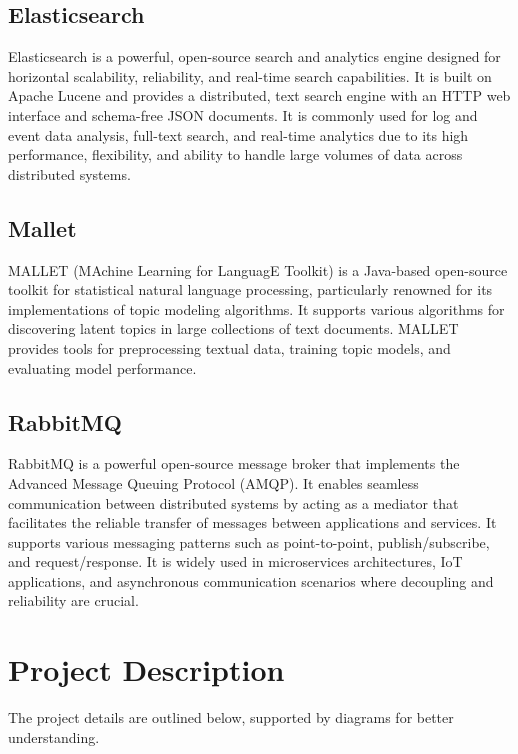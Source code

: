 \subsection{Elasticsearch}
Elasticsearch is a powerful, open-source search and analytics engine designed for horizontal scalability,
reliability, and real-time search capabilities. It is built on Apache Lucene and provides a distributed, text
search engine with an HTTP web interface and schema-free JSON documents. It is commonly used for log and event
data analysis, full-text search, and real-time analytics due to its high performance, flexibility, and ability
to handle large volumes of data across distributed systems. \cite{elastic}

\subsection{Mallet}
MALLET (MAchine Learning for LanguagE Toolkit) is a Java-based open-source toolkit for statistical natural
language processing, particularly renowned for its implementations of topic modeling algorithms. It supports
various algorithms for discovering latent topics in large collections of text documents. MALLET provides tools
for preprocessing textual data, training topic models, and evaluating model performance. \cite{mallet}

\subsection{RabbitMQ}
RabbitMQ is a powerful open-source message broker that implements the Advanced Message Queuing Protocol (AMQP).
It enables seamless communication between distributed systems by acting as a mediator that facilitates the
reliable transfer of messages between applications and services. It supports various messaging patterns such
as point-to-point, publish/subscribe, and request/response. It is widely used in microservices architectures,
IoT applications, and asynchronous communication scenarios where decoupling and reliability are crucial.
\cite{rabbitmq}

\section{Project Description}
The project details are outlined below, supported by diagrams for better understanding.

